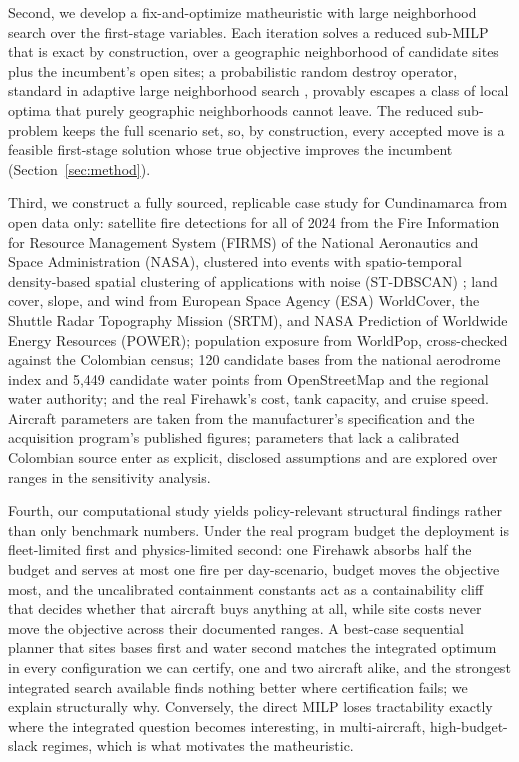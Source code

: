 \documentclass[11pt]{article}
\begin{document}
Second, we develop a fix-and-optimize matheuristic
\citep{helber2010} with large neighborhood search \citep{pisinger2010}
over the first-stage variables. Each iteration solves a reduced
sub-MILP that is exact by construction, over a geographic neighborhood
of candidate sites plus the incumbent's open sites; a probabilistic
random destroy operator, standard in adaptive large neighborhood
search \citep{ropke2006}, provably escapes a class of local optima
that purely geographic neighborhoods cannot leave. The reduced
sub-problem keeps the full scenario set, so, by construction, every
accepted move is a feasible first-stage solution whose true objective
improves the incumbent (Section~\ref{sec:method}).

Third, we construct a fully sourced, replicable case study for
Cundinamarca from open data only: satellite fire detections for all of
2024 from the Fire Information for Resource Management System (FIRMS)
of the National Aeronautics and Space Administration (NASA), clustered
into events with spatio-temporal density-based spatial clustering of
applications with noise (ST-DBSCAN) \citep{birant2007}; land cover,
slope, and wind from European Space Agency (ESA) WorldCover, the
Shuttle Radar Topography Mission (SRTM), and NASA Prediction of
Worldwide Energy Resources (POWER);
population exposure from WorldPop, cross-checked against the Colombian
census; 120 candidate bases from the national aerodrome index and
5,449 candidate water points from OpenStreetMap and the regional water
authority; and the real Firehawk's cost, tank capacity, and cruise
speed. Aircraft parameters are taken from the manufacturer's
specification and the acquisition program's published figures;
parameters that lack a calibrated Colombian source enter as explicit,
disclosed assumptions and are explored over ranges in the sensitivity
analysis.

Fourth, our computational study yields policy-relevant structural
findings rather than only benchmark numbers. Under the real program
budget the deployment is fleet-limited first and physics-limited
second: one Firehawk absorbs half the budget and serves at most one
fire per day-scenario, budget moves the objective most, and the
uncalibrated containment constants act as a containability cliff
that decides whether that aircraft buys anything at all, while site
costs never move the objective across their documented ranges. A
best-case sequential planner that sites bases first and water second
matches the integrated optimum in every configuration we can
certify, one and two aircraft alike, and the strongest integrated
search available finds nothing better where certification fails; we
explain structurally why. Conversely, the direct MILP loses
tractability exactly where the integrated question becomes
interesting, in multi-aircraft, high-budget-slack regimes, which is
what motivates the matheuristic.
\end{document}
